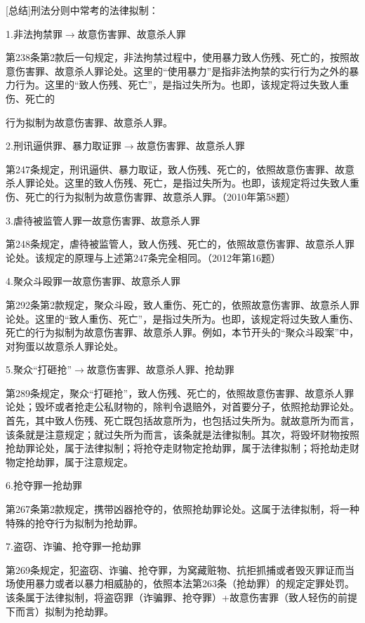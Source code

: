 [总结]刑法分则中常考的法律拟制：

1.非法拘禁罪\ensuremath{\rightarrow}故意伤害罪、故意杀人罪

第238条第2款后一句规定，非法拘禁过程中，使用暴力致人伤残、死亡的，按照故意伤害罪、故意杀人罪论处。这里的“使用暴力”是指非法拘禁的实行行为之外的暴力行为。这里的“致人伤残、死亡”，是指过失所为。也即，该规定将过失致人重伤、死亡的

行为拟制为故意伤害罪、故意杀人罪。

2.刑讯逼供罪、暴力取证罪\ensuremath{\rightarrow}故意伤害罪、故意杀人罪

第247条规定，刑讯逼供、暴力取证，致人伤残、死亡的，依照故意伤害罪、故意杀人罪论处。这里的致人伤残、死亡，是指过失所为。也即，该规定将过失致人重伤、死亡的行为拟制为故意伤害罪、故意杀人罪。（2010年第58题）

3.虐待被监管人罪一故意伤害罪、故意杀人罪

第248条规定，虐待被监管人，致人伤残、死亡的，依照故意伤害罪、故意杀人罪论处。该规定的原理与上述第247条完全相同。（2012年第16题）

4.聚众斗殴罪一故意伤害罪、故意杀人罪

第292条第2款规定，聚众斗殴，致人重伤、死亡的，依照故意伤害罪、故意杀人罪论处。这里的“致人重伤、死亡”，是指过失所为。也即，该规定将过失致人重伤、死亡的行为拟制为故意伤害罪、故意杀人罪。例如，本节开头的“聚众斗殴案”中，对狗蛋以故意杀人罪论处。

5.聚众“打砸抢”\ensuremath{\rightarrow}故意伤害罪、故意杀人罪、抢劫罪

第289条规定，聚众“打砸抢”，致人伤残、死亡的，依照故意伤害罪、故意杀人罪论处；毁坏或者抢走公私财物的，除判令退赔外，对首要分子，依照抢劫罪论处。首先，其中致人伤残、死亡既包括故意所为，也包括过失所为。就故意所为而言，该条就是注意规定；就过失所为而言，该条就是法律拟制。其次，将毁坏财物按照抢劫罪论处，属于法律拟制；将抢夺走财物定抢劫罪，属于法律拟制；将抢劫走财物定抢劫罪，属于注意规定。

6.抢夺罪一抢劫罪

第267条第2款规定，携带凶器抢夺的，依照抢劫罪论处。这属于法律拟制，将一种特殊的抢夺行为拟制为抢劫罪。

7.盗窃、诈骗、抢夺罪一抢劫罪

第269条规定，犯盗窃、诈骗、抢夺罪，为窝藏赃物、抗拒抓捕或者毁灭罪证而当场使用暴力或者以暴力相威胁的，依照本法第263条（抢劫罪）的规定定罪处罚。该条属于法律拟制，将盗窃罪（诈骗罪、抢夺罪）+故意伤害罪（致人轻伤的前提下而言）拟制为抢劫罪。

